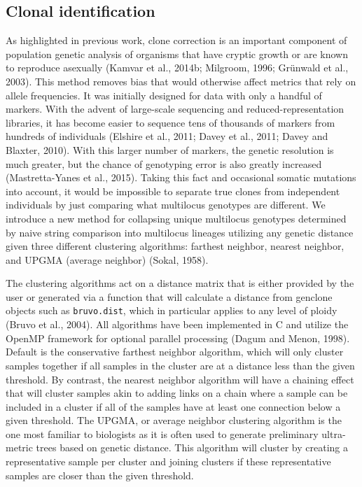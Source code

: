\documentclass{frontiersSCNS} %
\begin{document}
\subsection*{Clonal identification}\label{clonal-identification}

As highlighted in previous work, clone correction is an important
component of population genetic analysis of organisms that have cryptic
growth or are known to reproduce asexually (Kamvar et al., 2014b;
Milgroom, 1996; Grünwald et al., 2003). This method removes bias that
would otherwise affect metrics that rely on allele frequencies. It was
initially designed for data with only a handful of markers. With the
advent of large-scale sequencing and reduced-representation libraries,
it has become easier to sequence tens of thousands of markers from
hundreds of individuals (Elshire et al., 2011; Davey et al., 2011; Davey
and Blaxter, 2010). With this larger number of markers, the genetic
resolution is much greater, but the chance of genotyping error is also
greatly increased (Mastretta-Yanes et al., 2015). Taking this fact and
occasional somatic mutations into account, it would be impossible to
separate true clones from independent individuals by just comparing what
multilocus genotypes are different. We introduce a new method for
collapsing unique multilocus genotypes determined by naive string
comparison into multilocus lineages utilizing any genetic distance given
three different clustering algorithms: farthest neighbor, nearest
neighbor, and UPGMA (average neighbor) (Sokal, 1958).

The clustering algorithms act on a distance matrix that is either
provided by the user or generated via a function that will calculate a
distance from genclone objects such as \texttt{bruvo.dist}, which in
particular applies to any level of ploidy (Bruvo et al., 2004). All
algorithms have been implemented in C and utilize the OpenMP framework
for optional parallel processing (Dagum and Menon, 1998). Default is the
conservative farthest neighbor algorithm, which will only cluster
samples together if all samples in the cluster are at a distance less
than the given threshold. By contrast, the nearest neighbor algorithm
will have a chaining effect that will cluster samples akin to adding
links on a chain where a sample can be included in a cluster if all of
the samples have at least one connection below a given threshold. The
UPGMA, or average neighbor clustering algorithm is the one most familiar
to biologists as it is often used to generate preliminary ultra-metric
trees based on genetic distance. This algorithm will cluster by creating
a representative sample per cluster and joining clusters if these
representative samples are closer than the given threshold.
\end{document}
